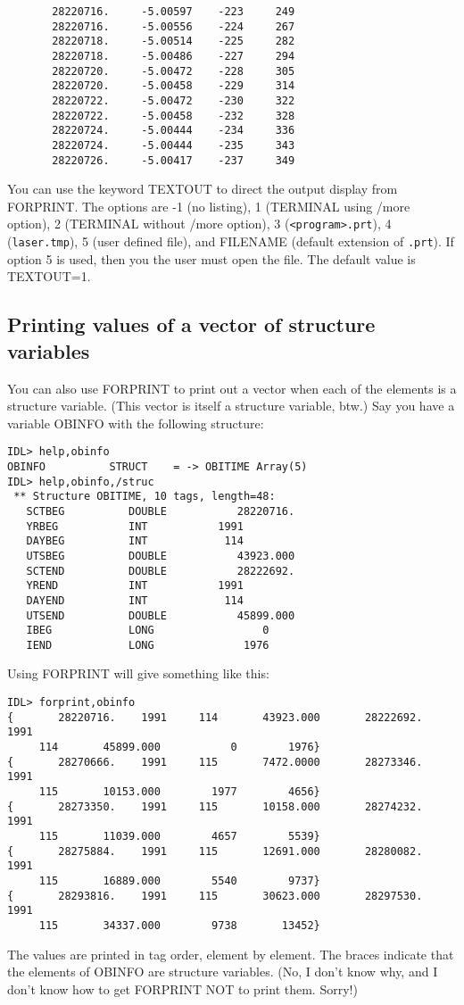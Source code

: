 \medskip\noindent
\begin{verbatim}
       28220716.     -5.00597    -223     249
       28220716.     -5.00556    -224     267
       28220718.     -5.00514    -225     282
       28220718.     -5.00486    -227     294
       28220720.     -5.00472    -228     305
       28220720.     -5.00458    -229     314
       28220722.     -5.00472    -230     322
       28220722.     -5.00458    -232     328
       28220724.     -5.00444    -234     336
       28220724.     -5.00444    -235     343
       28220726.     -5.00417    -237     349
\end{verbatim}
You can use the keyword TEXTOUT to direct the output display from FORPRINT. The
options are -1 (no listing), 1 (TERMINAL using /more option), 2 (TERMINAL
without /more option), 3 ({\tt <program>.prt}), 4 ({\tt laser.tmp}), 5 (user defined
file), and FILENAME (default extension of {\tt .prt}). If option 5 is used, then
you the user must open the file. The default value is TEXTOUT=1.
 

\subsection{Printing values of a vector of structure variables}
 
You can also use FORPRINT to print out a vector when each of the elements is a
structure variable. (This vector is itself a structure variable, btw.) Say you
have a variable OBINFO with the following structure:

\medskip\noindent
\begin{verbatim}
IDL> help,obinfo
OBINFO          STRUCT    = -> OBITIME Array(5)
IDL> help,obinfo,/struc
 ** Structure OBITIME, 10 tags, length=48:
   SCTBEG          DOUBLE           28220716.
   YRBEG           INT           1991
   DAYBEG          INT            114
   UTSBEG          DOUBLE           43923.000
   SCTEND          DOUBLE           28222692.
   YREND           INT           1991
   DAYEND          INT            114
   UTSEND          DOUBLE           45899.000
   IBEG            LONG                 0
   IEND            LONG              1976
\end{verbatim}
Using FORPRINT will give something like this:

\medskip\noindent
\begin{verbatim}
IDL> forprint,obinfo
{       28220716.    1991     114       43923.000       28222692.    1991
     114       45899.000           0        1976}
{       28270666.    1991     115       7472.0000       28273346.    1991
     115       10153.000        1977        4656}
{       28273350.    1991     115       10158.000       28274232.    1991
     115       11039.000        4657        5539}
{       28275884.    1991     115       12691.000       28280082.    1991
     115       16889.000        5540        9737}
{       28293816.    1991     115       30623.000       28297530.    1991
     115       34337.000        9738       13452}
\end{verbatim}
The values are printed in tag order, element by element. The braces indicate
that the elements of OBINFO are structure variables. (No, I don't know why, and
I don't know how to get FORPRINT NOT to print them. Sorry!)
 
